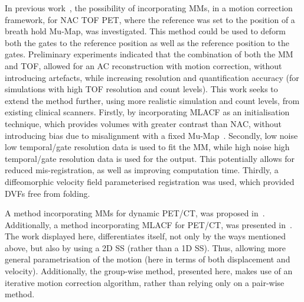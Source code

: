             In previous work~\parencite{Whitehead2019ImpactPET, Whitehead2020PET/CTFields, Whitehead2021ComparisonMap}, the possibility of incorporating \glspl{MM}, in a motion correction framework, for \gls{NAC} \gls{TOF} \gls{PET}, where the reference was set to the position of a breath hold \gls{Mu-Map}, was investigated. This method could be used to deform both the gates to the reference position as well as the reference position to the gates. Preliminary experiments indicated that the combination of both the \gls{MM} and \gls{TOF}, allowed for an \gls{AC} reconstruction with motion correction, without introducing artefacts, while increasing resolution and quantification accuracy (for simulations with high \gls{TOF} resolution and count levels). This work seeks to extend the method further, using more realistic simulation and count levels, from existing clinical scanners. Firstly, by incorporating \gls{MLACF} as an initialisation technique, which provides volumes with greater contrast than \gls{NAC}, without introducing bias due to misalignment with a fixed \gls{Mu-Map}~\parencite{Nuyts2012ML-reconstructionFactors}. Secondly, low noise low temporal/gate resolution data is used to fit the \gls{MM}, while high noise high temporal/gate resolution data is used for the output. This potentially allows for reduced mis-registration, as well as improving computation time. Thirdly, a diffeomorphic velocity field parameterised registration was used, which provided \glspl{DVF} free from folding.
            
            A method incorporating \glspl{MM} for dynamic \gls{PET}/\gls{CT}, was proposed in~\parencite{Chan2018Non-RigidPET}. Additionally, a method incorporating \gls{MLACF} for \gls{PET}/\gls{CT}, was presented in~\parencite{Lu2018RespiratoryData}. The work displayed here, differentiates itself, not only by the ways mentioned above, but also by using a \gls{2D} \gls{SS} (rather than a \gls{1D} \gls{SS}). Thus, allowing more general parametrisation of the motion (here in terms of both displacement and velocity). Additionally, the group-wise method, presented here, makes use of an iterative motion correction algorithm, rather than relying only on a pair-wise method.
        
